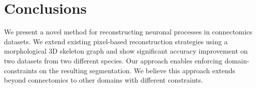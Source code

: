 \section{Conclusions}

We present a novel method for reconstructing neuronal processes in connectomics datasets. We extend existing pixel-based reconstruction strategies using a morphological 3D skeleton graph and show significant accuracy improvement on two datasets from two different species. Our approach enables enforcing domain-constraints on the resulting segmentation. We believe this approach extends beyond connectomics to other domains with different constraints.
